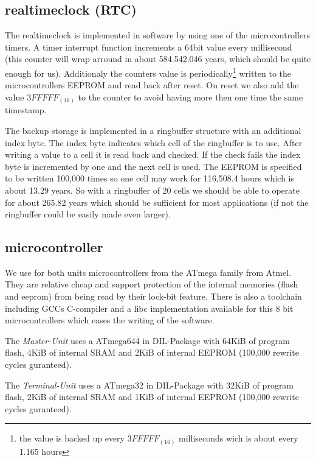 
\subsection{realtimeclock (RTC)}
The realtimeclock is implemented in software by using one of the microcontrollers timers. A timer interrupt function increments a 64bit value every millisecond (this counter will wrap arround in about 584.542.046 years, which should be quite enough for us). Additionaly the counters value is periodically\footnote{the value is backed up every $3FFFFF_{(16)}$ milliseconds wich is about every 1.165 hours} written to the microcontrollers EEPROM and read back after reset. On reset we also add the value $3FFFFF_{(16)}$ to the counter to avoid having more then one time the same timestamp.

The backup storage is implemented in a ringbuffer structure with an additional index byte. 
The index byte indicates which cell of the ringbuffer is to use. After writing a value to a cell it is read back and checked. If the check fails the index byte is incremented by one and the next cell is used. The EEPROM is specified to be written 100,000 times so one cell may work for 116,508.4 hours which is about 13.29 years. So with a ringbuffer of 20 cells we should be able to operate for about 265.82 years which should be sufficient for most applications (if not the ringbuffer could be easily made even larger).


\subsection{microcontroller}
We use for both units microcontrollers from the ATmega family from Atmel\cite{Atmel}. They are relative cheap and support protection of the internal memories (flash and eeprom) from being read by their lock-bit feature. There is also a toolchain including GCCs\cite{GCC} C-compiler and a libc implementation\cite{AVR-Libc} available for this 8 bit microcontrollers which eases the writing of the software.

The \textit{Master-Unit} uses a ATmega644\cite{ATmega644} in DIL-Package with 64KiB of program flash, 4KiB of internal SRAM and 2KiB of internal EEPROM (100,000 rewrite cycles guranteed).

The \textit{Terminal-Unit} uses a ATmega32\cite{ATmega32} in DIL-Package with 32KiB of program flash, 2KiB of internal SRAM and 1KiB of internal EEPROM (100,000 rewrite cycles guranteed).
 

